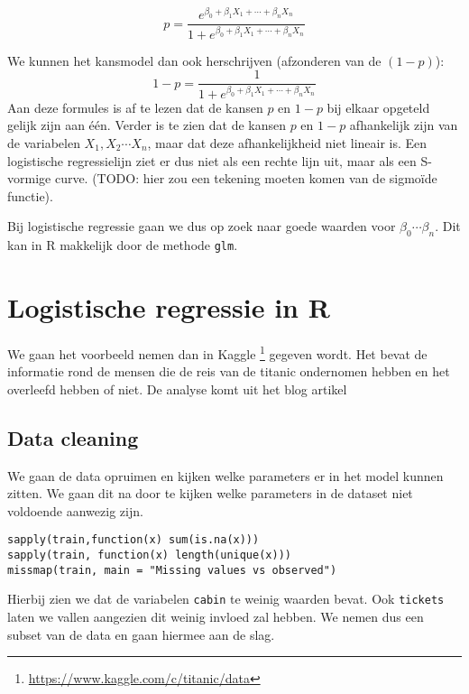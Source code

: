 \[ 
	p = \frac{e^{\beta_0 + \beta_1 X_1 + \cdots + \beta_n X_n }}{1+ e^{\beta_0 + \beta_1 X_1 + \cdots + \beta_n X_n }}
\]

We kunnen het kansmodel dan ook herschrijven (afzonderen van de $(1-p)$):
\[ 
1-p = \frac{1}{1+ e^{\beta_0 + \beta_1 X_1 + \cdots + \beta_n X_n }}
\]
Aan deze formules is af te lezen dat de kansen $p$ en $1-p$ bij elkaar opgeteld gelijk zijn aan \'e\'en.
Verder is te zien dat de kansen $p$ en $1-p$ afhankelijk zijn van de variabelen $X_1, X_2 \cdots X_n$, maar dat deze afhankelijkheid niet lineair is. Een logistische regressielijn ziet er dus niet als een rechte lijn
uit, maar als een S-vormige curve. (TODO: hier zou een tekening moeten komen van de sigmo\"ide functie).

Bij logistische regressie gaan we dus op zoek naar goede waarden voor $\beta_0 \cdots \beta_n$. Dit kan in R makkelijk door de methode \texttt{glm}.

\section{Logistische regressie in R}

We gaan het voorbeeld nemen dan in Kaggle \footnote{\href{https://www.kaggle.com/c/titanic/data}{https://www.kaggle.com/c/titanic/data}} gegeven wordt. Het bevat de informatie rond de mensen die de reis van de titanic ondernomen hebben en het overleefd hebben of niet. De analyse komt uit het blog artikel \cite{michy}

\subsection{Data cleaning}

We gaan de data opruimen en kijken welke parameters er in het model kunnen zitten. We gaan dit na door te kijken welke parameters in de dataset niet voldoende aanwezig zijn. 

\begin{lstlisting}
sapply(train,function(x) sum(is.na(x)))
sapply(train, function(x) length(unique(x)))
missmap(train, main = "Missing values vs observed")
\end{lstlisting}
Hierbij zien we dat de variabelen \texttt{cabin} te weinig waarden bevat. Ook \texttt{tickets} laten we vallen aangezien dit weinig invloed zal hebben. 
 We nemen dus een subset van de data en gaan hiermee aan de slag. 
 
 
